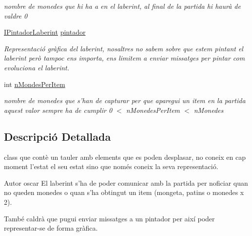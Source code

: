 \begin{DoxyCompactItemize}
\begin{DoxyCompactList}\small\item\em nombre de monedes que hi ha a en el laberint, al final de la partida hi haurà de valdre 0 \end{DoxyCompactList}\item 
\hypertarget{classlogica_1_1laberints_1_1_laberint_a4073632c1d1ab02ede9cddc2bbb6da2f}{\hyperlink{interfaceinterficie_1_1_i_pintador_laberint}{I\+Pintador\+Laberint} \hyperlink{classlogica_1_1laberints_1_1_laberint_a4073632c1d1ab02ede9cddc2bbb6da2f}{pintador}}\label{classlogica_1_1laberints_1_1_laberint_a4073632c1d1ab02ede9cddc2bbb6da2f}

\begin{DoxyCompactList}\small\item\em Representació gràfica del laberint, nosaltres no sabem sobre que estem pintant el laberint però tampoc ens importa, ens limitem a enviar missatges per pintar com evoluciona el laberint. \end{DoxyCompactList}\item 
\hypertarget{classlogica_1_1laberints_1_1_laberint_a65b89b5e73ed4533df3a8c2296e492be}{int \hyperlink{classlogica_1_1laberints_1_1_laberint_a65b89b5e73ed4533df3a8c2296e492be}{n\+Mondes\+Per\+Item}}\label{classlogica_1_1laberints_1_1_laberint_a65b89b5e73ed4533df3a8c2296e492be}

\begin{DoxyCompactList}\small\item\em nombre de monedes que s'han de capturar per que aparegui un item en la partida aquest valor sempre ha de cumplir 0 $<$ n\+Monedes\+Per\+Item $<$ n\+Monedes \end{DoxyCompactList}\end{DoxyCompactItemize}


\subsection{Descripció Detallada}
class que contè un tauler amb elements que es poden desplasar, no coneix en cap moment l'estat el seu estat sino que només coneix la seva representació. 

\begin{DoxyAuthor}{Autor}
oscar El laberint s'ha de poder comunicar amb la partida per noficiar quan no queden monedes o quan s'ha obtingut un item (mongeta, patins o monedes x 2).
\end{DoxyAuthor}
També caldrà que pugui enviar missatges a un pintador per així poder representar-\/se de forma gràfica.


